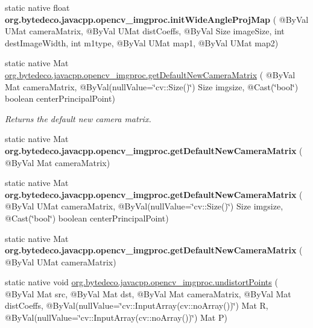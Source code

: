 \begin{DoxyCompactItemize}
\item 
\mbox{\label{group__imgproc__transform_gabd59413d81a2a999b9437f22d27a24fc}} 
static native float {\bfseries org.\+bytedeco.\+javacpp.\+opencv\+\_\+imgproc.\+init\+Wide\+Angle\+Proj\+Map} ( @By\+Val U\+Mat camera\+Matrix, @By\+Val U\+Mat dist\+Coeffs, @By\+Val Size image\+Size, int dest\+Image\+Width, int m1type, @By\+Val U\+Mat map1, @By\+Val U\+Mat map2)
\item 
static native Mat \hyperlink{group__imgproc__transform_gadf9fb3deefd512a073b449832fe60679}{org.\+bytedeco.\+javacpp.\+opencv\+\_\+imgproc.\+get\+Default\+New\+Camera\+Matrix} ( @By\+Val Mat camera\+Matrix, @By\+Val(null\+Value=\char`\"{}cv\+::\+Size()\char`\"{}) Size imgsize, @Cast(\char`\"{}bool\char`\"{}) boolean center\+Principal\+Point)
\begin{DoxyCompactList}\small\item\em Returns the default new camera matrix. \end{DoxyCompactList}\item 
\mbox{\label{group__imgproc__transform_gaedb64877b79e75f7e81d5f11a07e17ac}} 
static native Mat {\bfseries org.\+bytedeco.\+javacpp.\+opencv\+\_\+imgproc.\+get\+Default\+New\+Camera\+Matrix} ( @By\+Val Mat camera\+Matrix)
\item 
\mbox{\label{group__imgproc__transform_ga92946780977d683b3185be16382896c0}} 
static native Mat {\bfseries org.\+bytedeco.\+javacpp.\+opencv\+\_\+imgproc.\+get\+Default\+New\+Camera\+Matrix} ( @By\+Val U\+Mat camera\+Matrix, @By\+Val(null\+Value=\char`\"{}cv\+::\+Size()\char`\"{}) Size imgsize, @Cast(\char`\"{}bool\char`\"{}) boolean center\+Principal\+Point)
\item 
\mbox{\label{group__imgproc__transform_ga8c2618a6f671b8cd211b32d88cc19426}} 
static native Mat {\bfseries org.\+bytedeco.\+javacpp.\+opencv\+\_\+imgproc.\+get\+Default\+New\+Camera\+Matrix} ( @By\+Val U\+Mat camera\+Matrix)
\item 
static native void \hyperlink{group__imgproc__transform_gaacf4ed74dd09b28d673cc4b0f0257aa8}{org.\+bytedeco.\+javacpp.\+opencv\+\_\+imgproc.\+undistort\+Points} ( @By\+Val Mat src, @By\+Val Mat dst, @By\+Val Mat camera\+Matrix, @By\+Val Mat dist\+Coeffs, @By\+Val(null\+Value=\char`\"{}cv\+::\+Input\+Array(cv\+::no\+Array())\char`\"{}) Mat R, @By\+Val(null\+Value=\char`\"{}cv\+::\+Input\+Array(cv\+::no\+Array())\char`\"{}) Mat P)

\end{DoxyCompactItemize}
